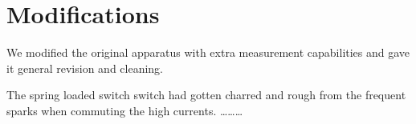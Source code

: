 \section{Modifications}

We modified the original apparatus with extra measurement capabilities and 
gave it general revision and cleaning.

The spring loaded switch switch had gotten charred and rough from the frequent sparks when commuting the high currents. \ldots \ldots \ldots
